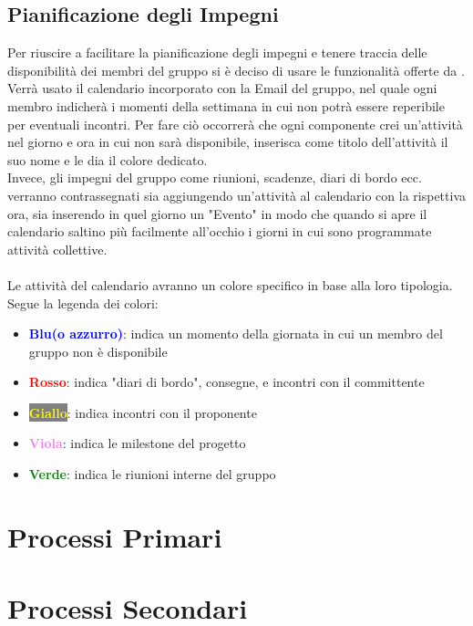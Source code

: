 \documentclass[a4paper,12pt]{article}
\begin{document}
\subsection{Pianificazione degli Impegni} \label{sec:pianificazioneImpegni}
Per riuscire a facilitare la pianificazione degli impegni e tenere traccia delle disponibilità dei membri del gruppo si è deciso di usare le funzionalità offerte da \textbf{\underline{}}. Verrà usato il calendario incorporato con la Email del gruppo, nel quale ogni membro indicherà i momenti della settimana in cui non potrà essere reperibile per eventuali incontri. Per fare ciò occorrerà che ogni componente crei un'attività nel giorno e ora in cui non sarà disponibile, inserisca come titolo dell'attività il suo nome e le dia il colore dedicato.
\\ Invece, gli impegni del gruppo come riunioni, scadenze, diari di bordo ecc. verranno contrassegnati sia aggiungendo un'attività al calendario con la rispettiva ora, sia inserendo in quel giorno un "Evento" in modo che quando si apre il calendario saltino più facilmente all'occhio i giorni in cui sono programmate attività collettive.\\\\
Le attività del calendario avranno un colore specifico in base alla loro tipologia.
Segue la legenda dei colori:

\begin{itemize}
    \item \textbf{\textcolor{blue}{Blu(o azzurro)}}: indica un momento della giornata in cui un membro del gruppo non è disponibile
    \item \textbf{\textcolor{red}{Rosso}}: indica "diari di bordo", consegne, e incontri con il committente
    \item \colorbox{gray}{\textbf{\textcolor{yellow}{Giallo}}}: indica incontri con il proponente
    \item \textbf{\textcolor{violet}{Viola}}: indica le milestone del progetto
    \item \textbf{\textcolor{green}{Verde}}: indica le riunioni interne del gruppo
\end{itemize}


\newpage
\section{Processi Primari}


\newpage
\section{Processi Secondari}
\end{document}
